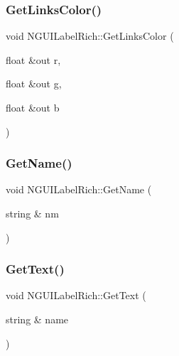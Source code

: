 \hypertarget{class_n_g_u_i_label_rich_a5a1b818293ba4c491a64f3be6eb2a058}{}\label{class_n_g_u_i_label_rich_a5a1b818293ba4c491a64f3be6eb2a058} 
\subsubsection{\texorpdfstring{Get\+Links\+Color()}{GetLinksColor()}}
{\footnotesize\ttfamily void N\+G\+U\+I\+Label\+Rich\+::\+Get\+Links\+Color (\begin{DoxyParamCaption}\item[{float \&out}]{r,  }\item[{float \&out}]{g,  }\item[{float \&out}]{b }\end{DoxyParamCaption})}

\hypertarget{class_n_g_u_i_label_rich_a6e99038527a6d412f8ba1797eb4eae94}{}\label{class_n_g_u_i_label_rich_a6e99038527a6d412f8ba1797eb4eae94} 
\subsubsection{\texorpdfstring{Get\+Name()}{GetName()}}
{\footnotesize\ttfamily void N\+G\+U\+I\+Label\+Rich\+::\+Get\+Name (\begin{DoxyParamCaption}\item[{string \&}]{nm }\end{DoxyParamCaption})}

\hypertarget{class_n_g_u_i_label_rich_ade8f2471a3cea78b7e9f22985d87ac9b}{}\label{class_n_g_u_i_label_rich_ade8f2471a3cea78b7e9f22985d87ac9b} 
\subsubsection{\texorpdfstring{Get\+Text()}{GetText()}}
{\footnotesize\ttfamily void N\+G\+U\+I\+Label\+Rich\+::\+Get\+Text (\begin{DoxyParamCaption}\item[{string \&}]{name }\end{DoxyParamCaption})}

